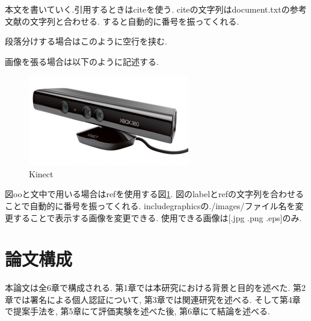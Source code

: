 本文を書いていく.引用するときはciteを使う\cite{cite_1}.
citeの文字列はdocument.txtの参考文献の文字列と合わせる.
すると自動的に番号を振ってくれる.

段落分けする場合はこのように空行を挟む.

画像を張る場合は以下のように記述する.

\begin{figure}[htbp]
  \begin{center}
    \includegraphics[clip,width=7.0cm]{./images/Kinect.jpg}
    \caption{Kinect}
    \label{fig:Kinect}
  \end{center}
\end{figure}

図ooと文中で用いる場合はrefを使用する図\ref{fig:Kinect}.
図のlabelとrefの文字列を合わせることで自動的に番号を振ってくれる.
includegraphicsの./images/ファイル名を変更することで表示する画像を変更できる.
使用できる画像は[.jpg .png .eps]のみ.

\section{論文構成}
本論文は全6章で構成される. 第1章では本研究における背景と目的を述べた. 第2章では署名による個人認証について, 第3章では関連研究を述べる. そして第4章で提案手法を, 第5章にて評価実験を述べた後, 第6章にて結論を述べる.

